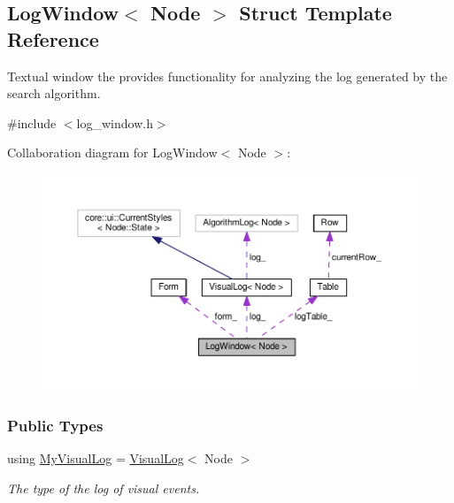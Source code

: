 \hypertarget{structLogWindow}{}\subsection{Log\+Window$<$ Node $>$ Struct Template Reference}
\label{structLogWindow}


Textual window the provides functionality for analyzing the log generated by the search algorithm.  




{\ttfamily \#include $<$log\+\_\+window.\+h$>$}



Collaboration diagram for Log\+Window$<$ Node $>$\+:\nopagebreak
\begin{figure}[H]
\begin{center}
\leavevmode
\includegraphics[width=350pt]{structLogWindow__coll__graph}
\end{center}
\end{figure}
\subsubsection*{Public Types}
\begin{DoxyCompactItemize}
\item 
using \hyperlink{structLogWindow_aac475b6f939a800e22ca9431bade9245}{My\+Visual\+Log} = \hyperlink{structVisualLog}{Visual\+Log}$<$ Node $>$\hypertarget{structLogWindow_aac475b6f939a800e22ca9431bade9245}{}\label{structLogWindow_aac475b6f939a800e22ca9431bade9245}

\begin{DoxyCompactList}\small\item\em The type of the log of visual events. \end{DoxyCompactList}\end{DoxyCompactItemize}

